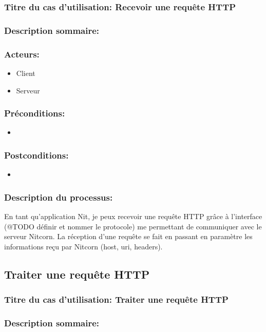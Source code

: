 \documentclass{scrreprt}
\begin{document}
\subsubsection{Titre du cas d'utilisation: Recevoir une requête HTTP}
\subsubsection{Description sommaire:}
\subsubsection{Acteurs:}
\begin{itemize}
	\item Client
    \item Serveur
\end{itemize}
\subsubsection{Préconditions:}
\begin{itemize}
    \item  
\end{itemize} 
\subsubsection{Postconditions:}
\begin{itemize}
    \item  
\end{itemize} 
\subsubsection{Description du processus:}En tant qu'application Nit, je peux recevoir une requête HTTP grâce à l'interface
(@TODO définir et nommer le protocole) me permettant de communiquer avec le serveur
Nitcorn. La réception d'une requête se fait en passant en paramètre les informations
reçu par Nitcorn (host, uri, headers).
\subsection{Traiter une requête HTTP}
\subsubsection{Titre du cas d'utilisation: Traiter une requête HTTP}
\subsubsection{Description sommaire:}
\end{document}
